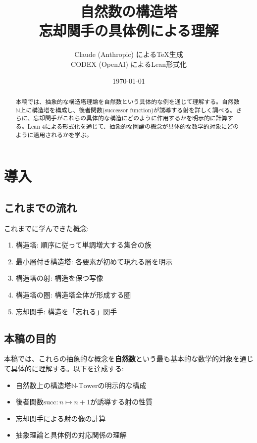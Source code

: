\documentclass[a4paper,12pt]{article}
\title{自然数の構造塔\\
\large 忘却関手の具体例による理解}
\author{Claude (Anthropic) によるTeX生成\\CODEX (OpenAI) によるLean形式化}
\date{\today}
\theoremstyle{definition}
\begin{document}
\maketitle

\begin{abstract}
本稿では、抽象的な構造塔理論を自然数という具体的な例を通じて理解する。自然数$\mathbb{N}$上に構造塔を構成し、後者関数(successor function)が誘導する射を詳しく調べる。さらに、忘却関手がこれらの具体的な構造にどのように作用するかを明示的に計算する。Lean 4による形式化を通じて、抽象的な圏論の概念が具体的な数学的対象にどのように適用されるかを学ぶ。
\end{abstract}

\tableofcontents

\section{導入}

\subsection{これまでの流れ}

これまでに学んできた概念:
\begin{enumerate}
\item 構造塔: 順序に従って単調増大する集合の族
\item 最小層付き構造塔: 各要素が初めて現れる層を明示
\item 構造塔の射: 構造を保つ写像
\item 構造塔の圏: 構造塔全体が形成する圏
\item 忘却関手: 構造を「忘れる」関手
\end{enumerate}

\subsection{本稿の目的}

本稿では、これらの抽象的な概念を\textbf{自然数}という最も基本的な数学的対象を通じて具体的に理解する。以下を達成する:

\begin{itemize}
\item 自然数上の構造塔$\mathbb{N}\text{-Tower}$の明示的な構成
\item 後者関数$\text{succ} : n \mapsto n+1$が誘導する射の性質
\item 忘却関手による射の像の計算
\item 抽象理論と具体例の対応関係の理解
\end{itemize}
\end{document}
